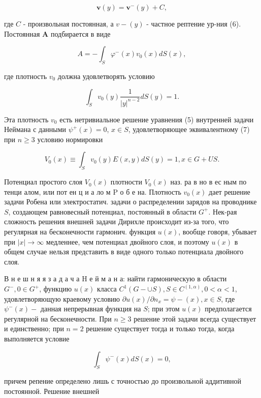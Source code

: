 \documentclass[10pt]{article}
\begin{document}
\[

\boldsymbol{v}(y)=\boldsymbol{v}^{-}(y)+C,

\]



где $C$ - произвольная постоянная, а $v-(y)$ - частное рептение ур-ния (6). Постоянная $\boldsymbol{A}$ подбирается в виде



\[

A=-\int_{S} \varphi^{-}(x) v_{0}(x) d S(x),

\]



где плотность $v_{0}$ должна удовлетворять условию



\[

\int_{S} v_{0}(y) \frac{1}{|y|^{n-2}} d S(y)=1 .

\]



Эта плотность $v_{0}$ есть нетривиальное решение уравнения (5) внутренней задачи Неймана с данными $\psi^{+}(x)=0$, $x \in S$, удовлетворяющее эквивалентному (7) при $n \geqslant 3$ условию нормировки



\[

V_{0}(x) \equiv \int_{S} v_{0}(y) E(x, y) d S(y)=1, x \in G+U S .

\]



Потенциал простого слоя $V_{0}(x)$ плотности $V_{0}(x)$ наз. ра в но в ес ным по тенци алом, или пот ен ц и а ло м $\mathrm{P}$ о б е на. Плотность $v_{0}(x)$ дает решение задачи Робена или электростатич. задачи о распределении зарядов на проводнике $S$, создающем равновесный потенциал, постоянный в области $G^{+}$. Нек-рая сложность решения внешней задачи Дирихле происходит из-за того, что регулярная на бесконечности гармонич. функция $u(x)$, вообще говоря, убывает при $|x| \rightarrow \infty$ медленнее, чем потенциал двойного слоя, и поэтому $u(x)$ в общем случае нельзя представить в виде одного только потенциала двойного слоя.



В н е ш н я я з а д а ч а $\mathrm{H}$ е й м а н а: найти гармоническую в области $G^{-}, 0 \in G^{+}$, функцию $u(x)$ класса $C^{1}(G-\cup S), S \in C^{(1, \alpha)}, 0<\alpha<1$, удовлетворяющую краевому условию $\partial u(x) / \partial n_{x}=\psi-(x), x \in S$, где $\psi^{-}(x)-$ данная непрерывная функция на $S$; при этом $u(x)$ предполагается регулярной на бесконечности. При $n \geqslant 3$ решение этой задачи всегда существует и единственно; при $n=2$ решение существует тогда и только тогда, когда выполняется условие



\[

\int_{S} \psi^{-}(x) d S(x)=0,

\]



причем репение определено лишь с точностью до произвольной аддитивной постоянной. Решение внешней
\end{document}
